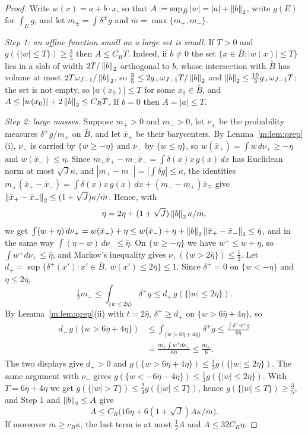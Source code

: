 \begin{proof}
Write $w(x)=a+b\cdot x$, so that $A:=\sup_{\bar B}|w|=|a|+\left\|b\right\|_2$, write $g(E)$ for $\int_Eg$, and let $m_\pm=\int\delta^\pm g$ and $\bar m=\max\{m_+,m_-\}$.

\emph{Step 1: an affine function small on a large set is small.} If $T>0$ and $g(\{|w|\le T\})\ge\frac35$ then $A\le C_RT$. Indeed, if $b\ne0$ the set $\{x\in\bar B:|w(x)|\le T\}$ lies in a slab of width $2T/\left\|b\right\|_2$ orthogonal to $b$, whose intersection with $\bar B$ has volume at most $2T\omega_{J-1}/\left\|b\right\|_2$, so $\frac35\le2g_+\omega_{J-1}T/\left\|b\right\|_2$ and $\left\|b\right\|_2\le\frac{10}3g_+\omega_{J-1}T$; the set is not empty, so $|w(x_0)|\le T$ for some $x_0\in\bar B$, and $A\le|w(x_0)|+2\left\|b\right\|_2\le C_RT$. If $b=0$ then $A=|a|\le T$.

\emph{Step 2: large masses.} Suppose $m_+>0$ and $m_->0$, let $\nu_\pm$ be the probability measures $\delta^\pm g/m_\pm$ on $\bar B$, and let $\bar x_\pm$ be their barycenters. By Lemma~\ref{m:lem:qrep}(i), $\nu_+$ is carried by $\{w\ge-\eta\}$ and $\nu_-$ by $\{w\le\eta\}$, so $w(\bar x_+)=\int w\,d\nu_+\ge-\eta$ and $w(\bar x_-)\le\eta$. Since $m_+\bar x_+-m_-\bar x_-=\int\delta(x)x\,g(x)\,dx$ has Euclidean norm at most $\sqrt J\kappa$, and $|m_+-m_-|=|\int\delta g|\le\kappa$, the identities $m_\pm(\bar x_+-\bar x_-)=\int\delta(x)x\,g(x)\,dx+(m_{-}-m_{+})\bar x_\mp$ give $\left\|\bar x_+-\bar x_-\right\|_2\le(1+\sqrt J)\kappa/\bar m$. Hence, with
\[
\bar\eta=2\eta+(1+\sqrt J)\left\|b\right\|_2\kappa/\bar m ,
\]
we get $\int(w+\eta)\,d\nu_+=w(\bar x_+)+\eta\le w(\bar x_-)+\eta+\left\|b\right\|_2\left\|\bar x_+-\bar x_-\right\|_2\le\bar\eta$, and in the same way $\int(\eta-w)\,d\nu_-\le\bar\eta$. On $\{w\ge-\eta\}$ we have $w^+\le w+\eta$, so $\int w^+d\nu_+\le\bar\eta$, and Markov's inequality gives $\nu_+(\{w>2\bar\eta\})\le\frac12$. Let $d_+=\sup\{\delta^+(x'):x'\in\bar B,\ w(x')\le2\bar\eta\}\le1$. Since $\delta^+=0$ on $\{w<-\eta\}$ and $\eta\le2\bar\eta$,
\[
\tfrac12m_+\le\int_{\{w\le2\bar\eta\}}\delta^+g\le d_+\,g(\{|w|\le2\bar\eta\}).
\]
By Lemma~\ref{m:lem:qrep}(ii) with $t=2\bar\eta$, $\delta^+\ge d_+$ on $\{w>6\bar\eta+4\eta\}$, so
\[
\begin{aligned}
d_+\,g(\{w>6\bar\eta+4\eta\})&\le\int_{\{w>6\bar\eta+4\eta\}}\delta^+g\le\frac{\int\delta^+w^+g}{6\bar\eta}\\
&=\frac{m_+\int w^+d\nu_+}{6\bar\eta}\le\frac{m_+}6 .
\end{aligned}
\]
The two displays give $d_+>0$ and $g(\{w>6\bar\eta+4\eta\})\le\frac13g(\{|w|\le2\bar\eta\})$. The same argument with $\nu_-$ gives $g(\{w<-6\bar\eta-4\eta\})\le\frac13g(\{|w|\le2\bar\eta\})$. With $T=6\bar\eta+4\eta$ we get $g(\{|w|>T\})\le\frac23g(\{|w|\le T\})$, hence $g(\{|w|\le T\})\ge\frac35$, and Step 1 and $\left\|b\right\|_2\le A$ give
\[
A\le C_R\big(16\eta+6(1+\sqrt J)A\kappa/\bar m\big).
\]
If moreover $\bar m\ge c_B\kappa$, the last term is at most $\frac12A$ and $A\le32C_R\eta$.


\end{proof}
